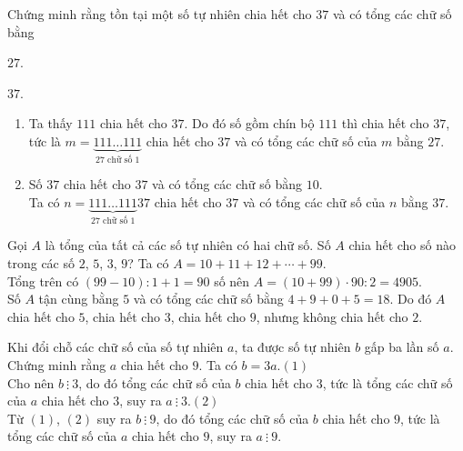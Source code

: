 \begin{vd}%
 Chứng minh rằng tồn tại một số tự nhiên chia hết cho $37$ và có tổng các chữ số bằng
 \begin{enumEX}{2}
  \item $27$.
  \item $37$.
 \end{enumEX}
 \loigiai
  {
  \begin{enumerate}
   \item Ta thấy $111$ chia hết cho $37$. Do đó số gồm chín bộ $111$ thì chia hết cho $37$, tức là $m=\underbrace{111\ldots 111}\limits_{27 \text{ chữ số } 1}$ chia hết cho $37$ và có tổng các chữ số của $m$ bằng $27$.
   \item Số $37$ chia hết cho $37$ và có tổng các chữ số bằng $10$.\\
   Ta có $n=\underbrace{111\ldots 111}\limits_{27 \text{ chữ số } 1}37$ chia hết cho $37$ và có tổng các chữ số của $n$ bằng $37$.
  \end{enumerate}
  }
\end{vd}

\begin{vd}%
 Gọi $A$ là tổng của tất cả các số tự nhiên có hai chữ số. Số $A$ chia hết cho số nào trong các số $2$, $5$, $3$, $9$?
 \loigiai
  {
  Ta có $A = 10 + 11 + 12 + \cdots + 99$.\\
  Tổng trên có $(99-10):1+1=90$ số nên $A=(10+99)\cdot 90 : 2 = 4905$.\\
  Số $A$ tận cùng bằng $5$ và có tổng các chữ số bằng $4+9+0+5=18$. Do đó $A$ chia hết cho $5$, chia hết cho $3$, chia hết cho $9$, nhưng không chia hết cho $2$.
  }
\end{vd}

\begin{vd}%
 Khi đổi chỗ các chữ số của số tự nhiên $a$, ta được số tự nhiên $b$ gấp ba lần số $a$. Chứng minh rằng $a$ chia hết cho $9$.
 \loigiai
  {
  Ta có $b=3a$.\hfill$(1)$\\
  Cho nên $b\ \vdots\ 3$, do đó tổng các chữ số của $b$ chia hết cho $3$, tức là tổng các chữ số của $a$ chia hết cho $3$, suy ra $a\ \vdots\ 3$.\hfill$(2)$\\
  Từ $(1)$, $(2)$ suy ra $b\ \vdots\ 9$, do đó tổng các chữ số của $b$ chia hết cho $9$, tức là tổng các chữ số của $a$ chia hết cho $9$, suy ra $a\ \vdots\ 9$.
  }
\end{vd}

